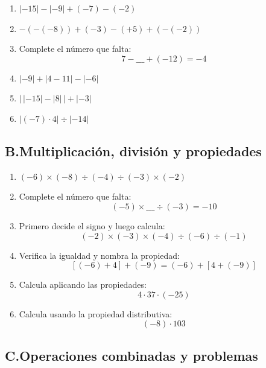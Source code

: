 \documentclass[12pt, letterpaper]{article}
\begin{document}
\begin{enumerate}[leftmargin=*]
  \item $|-15| - |-9| + (-7) - (-2)$

  \item $-(-(-8)) + (-3) - (+5) + (-(-2))$

  \item Complete el número que falta:
        \[
          7 - \_\_\_ + (-12) = -4
        \]

  \item $|-9| + |4 - 11| - |-6|$

  \item $\big|\,|-15| - |8|\,\big| + |-3|$

  \item $|(-7) \cdot 4| \div |-14|$
\end{enumerate}

\subsection*{B.\quad Multiplicación, división y propiedades}

\begin{enumerate}[leftmargin=*, start=7]
  \item $(-6) \times (-8) \div (-4) \div (-3) \times (-2)$

  \item Complete el número que falta:
        \[
          (-5) \times \_\_\_ \div (-3) = -10
        \]

  \item Primero decide el signo y luego calcula:
        \[
          (-2) \times (-3) \times (-4) \div (-6) \div (-1)
        \]

  \item Verifica la igualdad y nombra la propiedad:
        \[
          [(-6) + 4] + (-9) = (-6) + [4 + (-9)]
        \]

  \item Calcula aplicando las propiedades:
        \[
          4 \cdot 37 \cdot (-25)
        \]

  \item Calcula usando la propiedad distributiva:
        \[
          (-8) \cdot 103
        \]
\end{enumerate}

\subsection*{C.\quad Operaciones combinadas y problemas}
\end{document}
